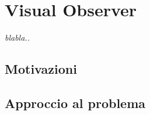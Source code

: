 \chapter{Visual Observer}
\label{chap:visualObs}

\begin{minipage}{12cm}\textit{blabla..}
\end{minipage}

\vspace*{1cm}



\section{Motivazioni}
\label{sec:motivi}


\section{Approccio al problema}
\label{sec:approccio}